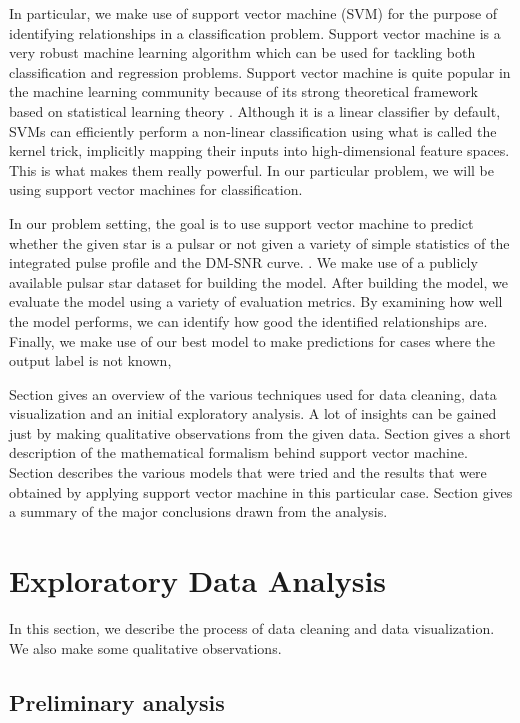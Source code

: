 \documentclass[conference]{IEEEtran}
\newcommand{\rom}[1]{\uppercase\expandafter{\romannumeral #1\relax}}
\begin{document}
In particular, we make use of support vector machine (SVM) for the purpose of identifying relationships in a classification problem. Support vector machine is a very robust machine learning algorithm which can be used for tackling both classification and regression problems. Support vector machine is quite popular in the machine learning community because of its strong theoretical framework based on statistical learning theory . Although it is a linear classifier by default, SVMs can efficiently perform a non-linear classification using what is called the kernel trick, implicitly mapping their inputs into high-dimensional feature spaces. This is what makes them really powerful. In our particular problem, we will be using support vector machines for classification.


In our problem setting, the goal is to use support vector machine to predict whether the given star is a pulsar or not given a variety of simple statistics of the integrated pulse profile and the DM-SNR curve. . We make use of a publicly available pulsar star dataset for building the model. After building the model, we evaluate the model using a variety of evaluation metrics. By examining how well the model performs, we can identify how good the identified relationships are. Finally, we make use of our best model to make predictions for cases where the output label is not known,


Section \rom{2} gives an overview of the various techniques used for data cleaning, data visualization and an initial exploratory analysis. A lot of insights can be gained just by making qualitative observations from the given data. Section \rom{3} gives a short description of the mathematical formalism behind support vector machine. Section \rom{4} describes the various models that were tried and the results that were obtained by applying support vector machine in this particular case. Section \rom{5} gives a summary of the major conclusions drawn from the analysis.


\section{Exploratory Data Analysis}

In this section, we describe the process of data cleaning and data visualization. We also make some qualitative observations.

\subsection{Preliminary analysis}
\end{document}
